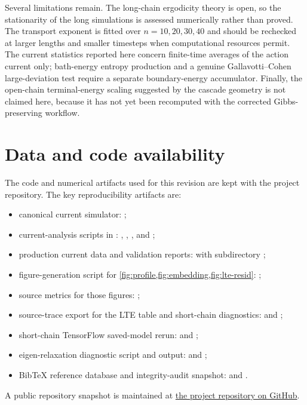 \documentclass[11pt,a4paper]{article}
\theoremstyle{definition}
\numberwithin{equation}{section}   %
\begin{document}
Several limitations remain. The long-chain ergodicity theory is open, so the
stationarity of the long simulations is assessed numerically rather than
proved. The transport exponent is fitted over $n=10,20,30,40$ and should be
rechecked at larger lengths and smaller timesteps when computational resources
permit. The current statistics reported here concern finite-time averages of
the action current only; bath-energy entropy production and a genuine
Gallavotti--Cohen large-deviation test require a separate boundary-energy
accumulator. Finally, the open-chain terminal-energy scaling suggested by the
cascade geometry is not claimed here, because it has not yet been recomputed
with the corrected Gibbs-preserving workflow.

\section*{Data and code availability}

The code and numerical artifacts used for this revision are kept with the
project repository. The key reproducibility artifacts are:
\begin{itemize}[leftmargin=*]
  \item canonical current simulator: ;
  \item current-analysis scripts in :
  , ,
  , and ;
  \item production current data and validation reports:
   with subdirectory
  ;
  \item figure-generation script for
  \cref{fig:profile,fig:embedding,fig:lte-resid}:
  ;
  \item source metrics for those figures:
  ;
  \item source-trace export for the LTE table and short-chain diagnostics:
   and
  ;
  \item short-chain TensorFlow saved-model rerun:
   and
  ;
  \item eigen-relaxation diagnostic script and output:
   and
  ;
  \item BibTeX reference database and integrity-audit snapshot:
   and .
\end{itemize}
A public repository snapshot is maintained at
\href{https://github.com/jayleenjiang/nls-energy-cascade}{the project
repository on GitHub}.
\end{document}
